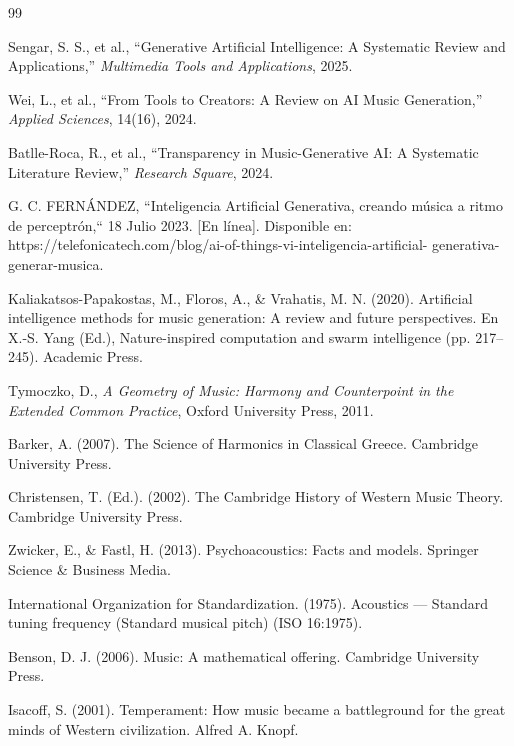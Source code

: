 \documentclass[12pt]{report}
\begin{document}
\begin{thebibliography}{99}

 Sengar, S. S., et al., ``Generative Artificial Intelligence: A Systematic Review and Applications,'' \textit{Multimedia Tools and Applications}, 2025.

 Wei, L., et al., ``From Tools to Creators: A Review on AI Music Generation,'' \textit{Applied Sciences}, 14(16), 2024.


 Batlle-Roca, R., et al., ``Transparency in Music-Generative AI: A Systematic Literature Review,'' \textit{Research Square}, 2024.


 G. C. FERNÁNDEZ, ``Inteligencia Artificial Generativa, creando música a ritmo de perceptrón,`` 18 Julio 2023. [En línea]. Disponible
en: https://telefonicatech.com/blog/ai-of-things-vi-inteligencia-artificial-
generativa-generar-musica.

 Kaliakatsos-Papakostas, M., Floros, A., \& Vrahatis, M. N. (2020). Artificial intelligence methods for music generation: A review and future perspectives. En
X.-S. Yang (Ed.), Nature-inspired computation and swarm intelligence (pp. 217–
245). Academic Press.


 Tymoczko, D., \textit{A Geometry of Music: Harmony and Counterpoint in the Extended Common Practice}, Oxford University Press, 2011.

Barker, A. (2007). The Science of Harmonics in Classical Greece. Cambridge University Press.

Christensen, T. (Ed.). (2002). The Cambridge History of Western Music Theory. Cambridge University Press.

 Zwicker, E., \& Fastl, H. (2013). Psychoacoustics: Facts and models. Springer Science \& Business Media.

 International Organization for Standardization. (1975). Acoustics — Standard tuning frequency (Standard musical pitch) (ISO 16:1975).

 Benson, D. J. (2006). Music: A mathematical offering. Cambridge University Press.


 Isacoff, S. (2001). Temperament: How music became a battleground for the great minds of Western civilization. Alfred A. Knopf.


\end{thebibliography}
\end{document}

